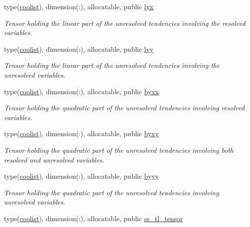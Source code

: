 \begin{DoxyCompactItemize}
type(\hyperlink{structtensor_1_1coolist}{coolist}), dimension(\+:), allocatable, public \hyperlink{namespacedec__tensor_aed1ce57179fc836a3c439d8c3da85049}{lyx}
\begin{DoxyCompactList}\small\item\em Tensor holding the linear part of the unresolved tendencies involving the resolved variables. \end{DoxyCompactList}\item 
type(\hyperlink{structtensor_1_1coolist}{coolist}), dimension(\+:), allocatable, public \hyperlink{namespacedec__tensor_a0b44998c712bdb9adad15a6bc4df8022}{lyy}
\begin{DoxyCompactList}\small\item\em Tensor holding the linear part of the unresolved tendencies involving the unresolved variables. \end{DoxyCompactList}\item 
type(\hyperlink{structtensor_1_1coolist}{coolist}), dimension(\+:), allocatable, public \hyperlink{namespacedec__tensor_adb81ce421da8f2b1c972c63ccdce6214}{byxx}
\begin{DoxyCompactList}\small\item\em Tensor holding the quadratic part of the unresolved tendencies involving resolved variables. \end{DoxyCompactList}\item 
type(\hyperlink{structtensor_1_1coolist}{coolist}), dimension(\+:), allocatable, public \hyperlink{namespacedec__tensor_a7c84cc16c29566626a9b6a47dde529f2}{byxy}
\begin{DoxyCompactList}\small\item\em Tensor holding the quadratic part of the unresolved tendencies involving both resolved and unresolved variables. \end{DoxyCompactList}\item 
type(\hyperlink{structtensor_1_1coolist}{coolist}), dimension(\+:), allocatable, public \hyperlink{namespacedec__tensor_ae146ffac640fe6d4dc52fb31f2c78956}{byyy}
\begin{DoxyCompactList}\small\item\em Tensor holding the quadratic part of the unresolved tendencies involving unresolved variables. \end{DoxyCompactList}\item 
type(\hyperlink{structtensor_1_1coolist}{coolist}), dimension(\+:), allocatable, public \hyperlink{namespacedec__tensor_a5e65ad7fdc3a92172a2e45341284fc6b}{ss\+\_\+tl\+\_\+tensor}

\end{DoxyCompactItemize}
